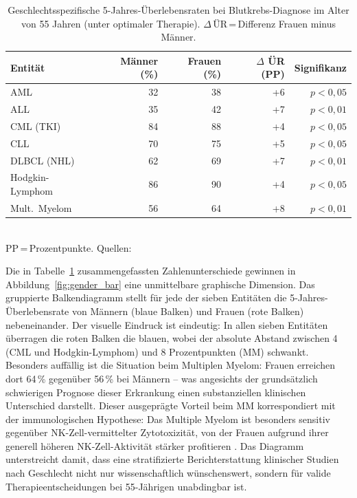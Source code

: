 ﻿\documentclass[12pt,a4paper]{article}
\theoremstyle{definition}
\begin{document}
\begin{table}[ht]
\centering
\caption{Geschlechtsspezifische 5-Jahres-Überlebensraten bei Blutkrebs-Diagnose
im Alter von 55 Jahren (unter optimaler Therapie). $\Delta$\,ÜR\,=\,Differenz
Frauen minus Männer.}
\label{tab:gender_survival}
\begin{tabular}{@{}lrrrr@{}}
\toprule
Entität & Männer (\%) & Frauen (\%) & $\Delta$ ÜR (PP) & Signifikanz \\
\midrule
AML           & 32 & 38 & +6  & $p < 0{,}05$ \\
ALL           & 35 & 42 & +7  & $p < 0{,}01$ \\
CML (TKI)     & 84 & 88 & +4  & $p < 0{,}05$ \\
CLL           & 70 & 75 & +5  & $p < 0{,}05$ \\
DLBCL (NHL)   & 62 & 69 & +7  & $p < 0{,}01$ \\
Hodgkin-Lymphom   & 86 & 90 & +4  & $p < 0{,}05$ \\
Mult.\ Myelom & 56 & 64 & +8  & $p < 0{,}01$ \\
\bottomrule
\end{tabular}
\smallskip\\
\footnotesize PP\,=\,Prozentpunkte. Quellen: \cite{micheli2009,cook2009,frey2010,siegel2023,coiffier2002,kumar2017,hochhaus2017}
\end{table}

Die in Tabelle~\ref{tab:gender_survival} zusammengefassten Zahlenunterschiede gewinnen
in Abbildung~\ref{fig:gender_bar} eine unmittelbare graphische Dimension. Das gruppierte
Balkendiagramm stellt für jede der sieben Entitäten die 5-Jahres-Überlebensrate von
Männern (blaue Balken) und Frauen (rote Balken) nebeneinander. Der visuelle Eindruck
ist eindeutig: In allen sieben Entitäten überragen die roten Balken die blauen, wobei
der absolute Abstand zwischen 4 (CML und Hodgkin-Lymphom) und 8 Prozentpunkten (MM)
schwankt. Besonders auffällig ist die Situation beim Multiplen Myelom: Frauen erreichen
dort 64\,\% gegenüber 56\,\% bei Männern -- was angesichts der grundsätzlich
schwierigen Prognose dieser Erkrankung einen substanziellen klinischen Unterschied
darstellt. Dieser ausgeprägte Vorteil beim MM korrespondiert mit der immunologischen
Hypothese: Das Multiple Myelom ist besonders sensitiv gegenüber NK-Zell-vermittelter
Zytotoxizität, von der Frauen aufgrund ihrer generell höheren NK-Zell-Aktivität stärker
profitieren \cite{frey2010}. Das Diagramm unterstreicht damit, dass eine stratifizierte
Berichterstattung klinischer Studien nach Geschlecht nicht nur wissenschaftlich
wünschenswert, sondern für valide Therapieentscheidungen bei 55-Jährigen unabdingbar ist.
\end{document}
